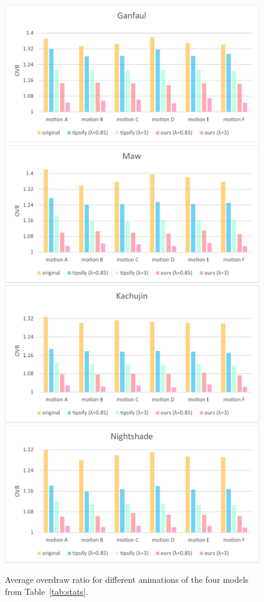 \begin{figure}[t]
\centering
\includegraphics[width=.49\textwidth]{plots/GanfaulRatio.pdf}
\includegraphics[width=.49\textwidth]{plots/MawRatio.pdf}
\includegraphics[width=.49\textwidth]{plots/KachujinRatio.pdf}
\includegraphics[width=.49\textwidth]{plots/NightshadeRatio.pdf}
\caption{Average overdraw ratio for different animations of the four models from Table~\ref{tab:stats}.}
\label{fig:results}
\end{figure}








